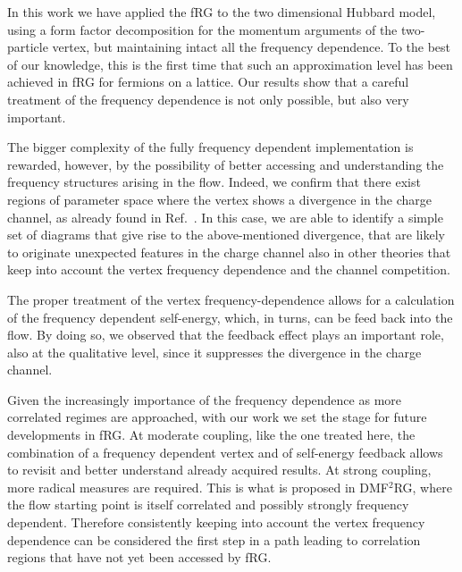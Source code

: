 In this work we have applied the fRG to the two dimensional Hubbard model, using a form factor decomposition for the momentum arguments of the two-particle vertex, but maintaining intact all the frequency dependence. 
To the best of our knowledge, this is the first time that such an approximation level has been achieved in fRG for fermions on a lattice.
Our results show that a careful treatment of the frequency dependence is not only possible, but also very important.

The bigger complexity of the fully frequency dependent implementation is rewarded, however, by the possibility of better accessing and understanding the frequency structures arising in the flow.
Indeed, we confirm that there exist regions of parameter space where the vertex shows a divergence in the charge channel, as already found in Ref.~.
 In this case, we are able to identify a simple set of diagrams that give rise to the above-mentioned divergence, that are likely to originate unexpected features in the charge channel also in other theories that keep into account the vertex frequency dependence and the channel competition.\cite{Stepanov2016}
 
The proper treatment of the vertex frequency-dependence allows for a  calculation of the frequency dependent self-energy, which, in turns, can be feed back into the flow.
 By doing so, we observed that the feedback effect plays an important role, also at the qualitative level, since it suppresses the divergence in the charge channel. 

Given the increasingly importance of the frequency dependence as more correlated regimes are approached, with our work we set the stage for future developments in fRG.
At moderate coupling, like the one treated here, the combination of a frequency dependent vertex and of self-energy feedback allows to revisit and better understand already acquired results.
At strong coupling, more radical measures are required. 
This is what is proposed in DMF$^2$RG,\cite{Taranto2014} where the flow starting point is itself correlated and possibly strongly frequency dependent. 
Therefore consistently keeping into account the vertex frequency dependence can be considered the first step in a path leading to correlation regions that have not yet been accessed by fRG.
 